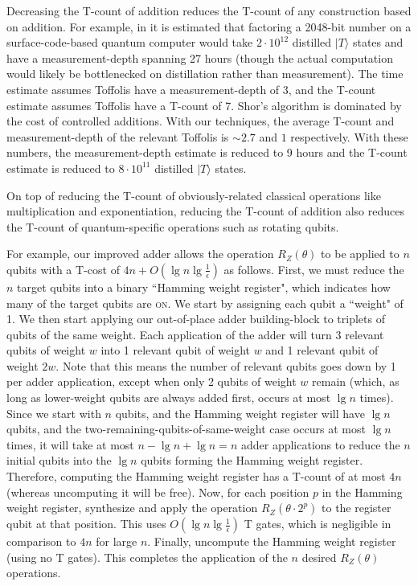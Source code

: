 \documentclass[twocolumn]{quantumarticle-customized}
\begin{document}
Decreasing the T-count of addition reduces the T-count of any construction based on addition.
For example, in \cite{Fowler2012} it is estimated that factoring a 2048-bit number on a surface-code-based quantum computer would take $2 \cdot 10^{12}$ distilled $|T\rangle$ states and have a measurement-depth spanning 27 hours (though the actual computation would likely be bottlenecked on distillation rather than measurement).
The time estimate assumes Toffolis have a measurement-depth of 3, and the T-count estimate assumes Toffolis have a T-count of 7.
Shor's algorithm is dominated by the cost of controlled additions.
With our techniques, the average T-count and measurement-depth of the relevant Toffolis is $\sim 2.7$ and $1$ respectively.
With these numbers, the measurement-depth estimate is reduced to 9 hours and the T-count estimate is reduced to $8 \cdot 10^{11}$ distilled $|T\rangle$ states.

On top of reducing the T-count of obviously-related classical operations like multiplication and exponentiation, reducing the T-count of addition also reduces the T-count of quantum-specific operations such as rotating qubits.

For example, our improved adder allows the operation $R_Z(\theta)$ to be applied to $n$ qubits with a T-cost of $4n + O(\lg n \lg \frac{1}{\epsilon})$ as follows.
First, we must reduce the $n$ target qubits into a binary ``Hamming weight register", which indicates how many of the target qubits are \textsc{on}.
We start by assigning each qubit a ``weight" of 1.
We then start applying our out-of-place adder building-block to triplets of qubits of the same weight.
Each application of the adder will turn 3 relevant qubits of weight $w$ into 1 relevant qubit of weight $w$ and 1 relevant qubit of weight $2w$.
Note that this means the number of relevant qubits goes down by 1 per adder application, except when only 2 qubits of weight $w$ remain (which, as long as lower-weight qubits are always added first, occurs at most $\lg n$ times).
Since we start with $n$ qubits, and the Hamming weight register will have $\lg n$ qubits, and the two-remaining-qubits-of-same-weight case occurs at most $\lg n$ times, it will take at most $n - \lg n + \lg n = n$ adder applications to reduce the $n$ initial qubits into the $\lg n$ qubits forming the Hamming weight register.
Therefore, computing the Hamming weight register has a T-count of at most $4n$ (whereas uncomputing it will be free).
Now, for each position $p$ in the Hamming weight register, synthesize and apply the operation $R_Z(\theta \cdot 2^p)$ to the register qubit at that position.
This uses $O(\lg n \lg \frac{1}{\epsilon})$ T gates, which is negligible in comparison to $4n$ for large $n$.
Finally, uncompute the Hamming weight register (using no T gates).
This completes the application of the $n$ desired $R_Z(\theta)$ operations.
\end{document}
